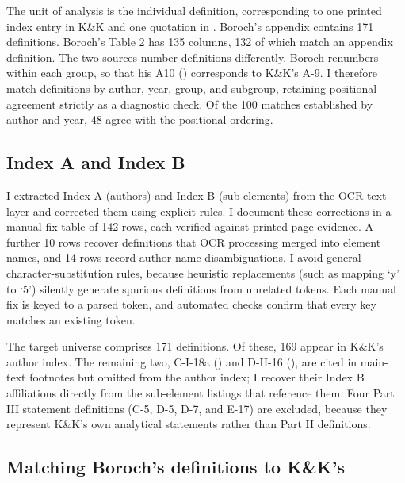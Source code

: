 \documentclass[11pt]{article}
\begin{document}
The unit of analysis is the individual definition, corresponding to one printed index entry in K\&K and one quotation in \citet{boroch2016}. Boroch's appendix contains 171 definitions. Boroch's Table 2 has 135 columns, 132 of which match an appendix definition. The two sources number definitions differently. Boroch renumbers within each group, so that his A10 (\citealt{winston1933}) corresponds to K\&K's A-9. I therefore match definitions by author, year, group, and subgroup, retaining positional agreement strictly as a diagnostic check. Of the 100 matches established by author and year, 48 agree with the positional ordering.

\subsection{Index A and Index B}

I extracted Index A (authors) and Index B (sub-elements) from the OCR text layer and corrected them using explicit rules. I document these corrections in a manual-fix table of 142 rows, each verified against printed-page evidence. A further 10 rows recover definitions that OCR processing merged into element names, and 14 rows record author-name disambiguations. I avoid general character-substitution rules, because heuristic replacements (such as mapping `y' to `5') silently generate spurious definitions from unrelated tokens. Each manual fix is keyed to a parsed token, and automated checks confirm that every key matches an existing token.

The target universe comprises 171 definitions. Of these, 169 appear in K\&K's author index. The remaining two, C-I-18a (\citealt{maquet1949}) and D-II-16 (\citealt{aberle1950}), are cited in main-text footnotes but omitted from the author index; I recover their Index B affiliations directly from the sub-element listings that reference them. Four Part III statement definitions (C-5, D-5, D-7, and E-17) are excluded, because they represent K\&K's own analytical statements rather than Part II definitions.

\subsection{Matching Boroch's definitions to K\&K's}
\end{document}
